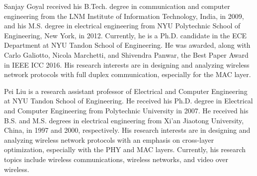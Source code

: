 \documentclass[journal]{IEEEtran}
\begin{document}
\begin{IEEEbiography}{Sanjay Goyal}
received his B.Tech. degree in communication and computer engineering from the LNM Institute of Information Technology, India, in 2009, and his M.S. degree in electrical engineering from
NYU Polytechnic School of Engineering, New York, in 2012. Currently, he is a Ph.D. candidate in the ECE Department at NYU Tandon School of Engineering. He was awarded, along with Carlo Galiotto, Nicola Marchetti, and Shivendra Panwar, the Best Paper Award in IEEE ICC 2016. His research interests are in designing and analyzing wireless network protocols with full duplex communication, especially for the MAC layer.
\end{IEEEbiography}  
\begin{IEEEbiography}{Pei Liu}
is a research assistant professor of Electrical and Computer Engineering at NYU Tandon School of Engineering. He received his Ph.D. degree in Electrical and Computer Engineering from Polytechnic University in 2007. He received his B.S. and M.S. degrees in electrical engineering from Xi'an Jiaotong University, China, in 1997 and 2000, respectively. His research interests are in designing and analyzing wireless network protocols with an emphasis on cross-layer optimization, especially with the PHY and MAC layers. Currently, his research topics include wireless communications, wireless networks, and video over wireless.
\end{IEEEbiography} 
\end{document}
